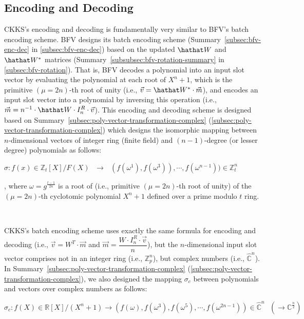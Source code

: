\subsection{Encoding and Decoding}
\label{subsec:ckks-encoding-decoding}


CKKS's encoding and decoding is fundamentally very similar to BFV's batch encoding scheme. BFV designs its batch encoding scheme (Summary~\ref*{subsec:bfv-enc-dec} in \autoref{subsec:bfv-enc-dec}) based on the updated $\hathat W$ and $\hathat W^*$ matrices (Summary~\ref*{subsubsec:bfv-rotation-summary} in \autoref{subsec:bfv-rotation}). That is, BFV decodes a polynomial into an input slot vector by evaluating the polynomial at each root of $X^n+1$, which is the primitive $(\mu=2n)$-th root of unity (i.e., $\vec{v} = \hathat W^* \cdot \vec{m}$), and encodes an input slot vector into a polynomial by inversing this operation (i.e., $\vec{m} = n^{-1} \cdot \hathat W \cdot I_n^R \cdot \vec{v}$). This encoding and decoding scheme is designed based on Summary~\ref*{subsec:poly-vector-transformation-complex} (\autoref{subsec:poly-vector-transformation-complex}) which designs the isomorphic mapping between $n$-dimensional vectors of integer ring (finite field) and $(n-1)$-degree (or lesser degree) polynomials as follows: 

$\sigma: f(x) \in \mathbb{Z}_t[X] / F(X) \text{ } \longrightarrow \text{ } (f(\omega^1), f(\omega^3)), \cdots, f(\omega^{n-1})) \in \mathbb{Z}_t^n$

, where $\omega = g^{\frac{t - 1}{2n}}$ is a root of (i.e., primitive $(\mu=2n)$-th root of unity) of the $(\mu=2n)$-th cyclotomic polynomial $X^n + 1$ defined over a prime modulo $t$ ring. 

$ $

CKKS's batch encoding scheme uses exactly the same formula for encoding and decoding (i.e., $\vec{v} = W^T \cdot \vec{m}$ and $\vec{m} = \dfrac{W \cdot I_n^R \cdot \vec{v}}{n}$), but the $n$-dimensional input slot vector comprises not in an integer ring (i.e., $\mathbb{Z}^n_p$), but complex numbers (i.e., $\mathbb{\hat C}^n$). In Summary~\ref*{subsec:poly-vector-transformation-complex} (\autoref{subsec:poly-vector-transformation-complex}), we also designed the mapping $\sigma_c$ between polynomials and vectors over complex numbers as follows:

$\sigma_c: f(X) \in \mathbb{R}[X]/(X^n + 1) \longrightarrow (f(\omega),f(\omega^3),f(\omega^5), \cdots, f(\omega^{2n-1})) \in \mathbb{\hat{C}}^{n} \text{ } (\longrightarrow \mathbb{C}^{\frac{n}{2}})$


